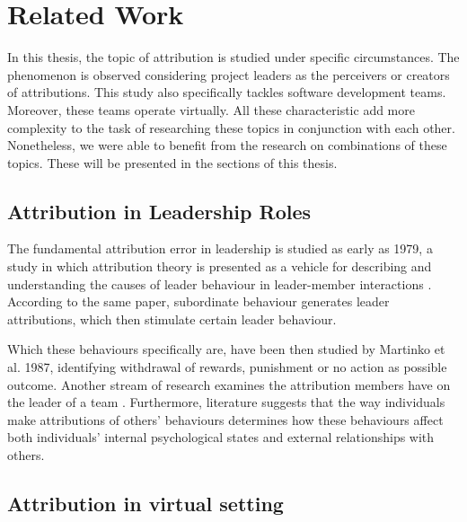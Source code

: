 \chapter{Related Work}


In this thesis, the topic of attribution is studied under specific circumstances. The phenomenon is observed considering project leaders as the perceivers or creators of attributions. This study also specifically tackles software development teams. Moreover, these teams operate virtually. All these characteristic add more complexity to the task of researching these topics in conjunction with each other. Nonetheless, we were able to benefit from the research on combinations of these topics. These will be presented in the sections of this thesis.

\section{Attribution in Leadership Roles}

The fundamental attribution error in leadership is studied as early as 1979, a study in which attribution theory is presented as a vehicle for describing and understanding the causes of leader behaviour in leader-member interactions \cite{Green1979}. According to the same paper, subordinate behaviour generates leader attributions, which then stimulate certain leader behaviour. 

Which these behaviours specifically are, have been then studied by Martinko et al. 1987, identifying withdrawal of rewards, punishment or no action as possible outcome. Another stream of research examines the attribution members have on the leader of a team \cite{Sweet2020}. Furthermore, literature \cite{Gardner2018} suggests that the way individuals make attributions of others' behaviours determines how these behaviours affect both individuals' internal psychological states and external relationships with others.


\section{Attribution in virtual setting}

